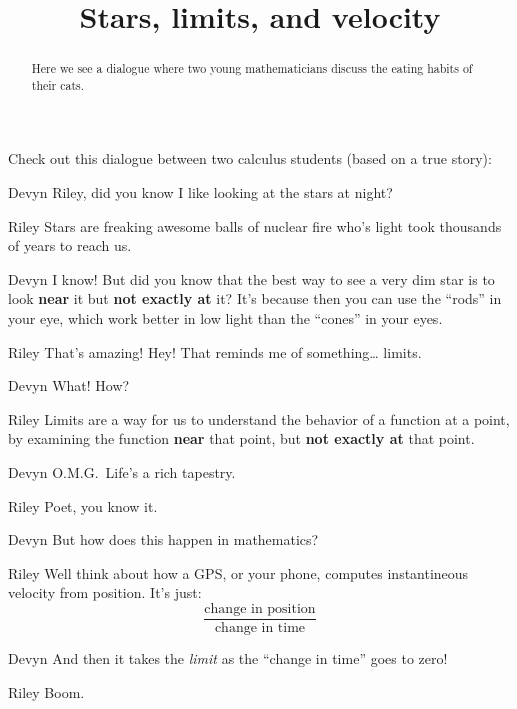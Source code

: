 \documentclass{ximera}
\title[Break-Ground:]{Stars, limits, and velocity}
\begin{document}
\begin{abstract}
Here we see a dialogue where two young mathematicians discuss the eating
habits of their cats.
\end{abstract}
\maketitle

Check out this dialogue between two calculus students (based on a true
story):

\begin{dialogue}
\item[Devyn] Riley, did you know I like looking at the stars at night?
\item[Riley] Stars are freaking awesome balls of nuclear fire who's
  light took thousands of years to reach us.
\item[Devyn] I know! But did you know that the best way to see a very
  dim star is to look \textbf{near} it but \textbf{not exactly at} it? It's
  because then you can use the ``rods'' in your eye, which work better
  in low light than the ``cones'' in your eyes.
\item[Riley] That's amazing! Hey! That reminds me of something\dots
  limits.
\item[Devyn] What! How?
\item[Riley] Limits are a way for us to understand the behavior of a
  function at a point, by examining the function \textbf{near} that point, but
  \textbf{not exactly at} that point.
\item[Devyn] O.M.G.\ Life's a rich tapestry.
\item[Riley] Poet, you know it.
\item[Devyn] But how does this happen in mathematics?
\item[Riley] Well think about how a GPS, or your phone, computes
  instantineous velocity from position. It's just:
  \[
  \frac{\text{change in position}}{\text{change in time}}
  \]
\item[Devyn] And then it takes the \textit{limit} as the ``change in
  time'' goes to zero!
\item[Riley] Boom.
\end{dialogue}

\begin{problem}
\end{problem}


\end{document}
